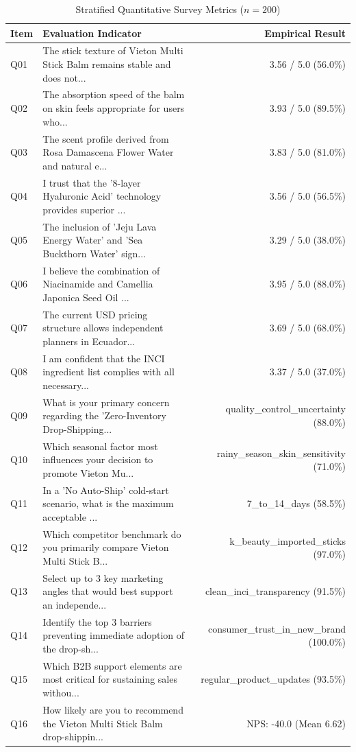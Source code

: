 \documentclass[10pt,twocolumn,a4paper]{article}
\begin{document}
\begin{table}[t]
\centering
\caption{Stratified Quantitative Survey Metrics ($n = 200$)}
\label{tab:metrics}
\small
\begin{tabularx}{\textwidth}{l X r}
\toprule
\textbf{Item} & \textbf{Evaluation Indicator} & \textbf{Empirical Result} \\
\midrule
Q01 & The stick texture of Vieton Multi Stick Balm remains stable and does not... & 3.56 / 5.0 (56.0\%) \\
Q02 & The absorption speed of the balm on skin feels appropriate for users who... & 3.93 / 5.0 (89.5\%) \\
Q03 & The scent profile derived from Rosa Damascena Flower Water and natural e... & 3.83 / 5.0 (81.0\%) \\
Q04 & I trust that the '8-layer Hyaluronic Acid' technology provides superior ... & 3.56 / 5.0 (56.5\%) \\
Q05 & The inclusion of 'Jeju Lava Energy Water' and 'Sea Buckthorn Water' sign... & 3.29 / 5.0 (38.0\%) \\
Q06 & I believe the combination of Niacinamide and Camellia Japonica Seed Oil ... & 3.95 / 5.0 (88.0\%) \\
Q07 & The current USD pricing structure allows independent planners in Ecuador... & 3.69 / 5.0 (68.0\%) \\
Q08 & I am confident that the INCI ingredient list complies with all necessary... & 3.37 / 5.0 (37.0\%) \\
Q09 & What is your primary concern regarding the 'Zero-Inventory Drop-Shipping... & quality\_control\_uncertainty (88.0\%) \\
Q10 & Which seasonal factor most influences your decision to promote Vieton Mu... & rainy\_season\_skin\_sensitivity (71.0\%) \\
Q11 & In a 'No Auto-Ship' cold-start scenario, what is the maximum acceptable ... & 7\_to\_14\_days (58.5\%) \\
Q12 & Which competitor benchmark do you primarily compare Vieton Multi Stick B... & k\_beauty\_imported\_sticks (97.0\%) \\
Q13 & Select up to 3 key marketing angles that would best support an independe... & clean\_inci\_transparency (91.5\%) \\
Q14 & Identify the top 3 barriers preventing immediate adoption of the drop-sh... & consumer\_trust\_in\_new\_brand (100.0\%) \\
Q15 & Which B2B support elements are most critical for sustaining sales withou... & regular\_product\_updates (93.5\%) \\
Q16 & How likely are you to recommend the Vieton Multi Stick Balm drop-shippin... & NPS: -40.0 (Mean 6.62) \\
\bottomrule
\end{tabularx}
\end{table}
\end{document}
